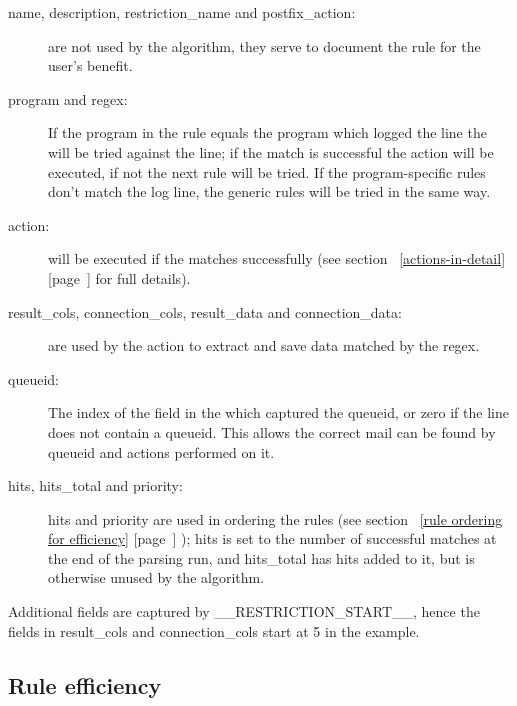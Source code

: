 \documentclass[a4paper,12pt,draft]{article}
\newcommand{\refwithpage}[1]{%
    \empty{}\ref{#1} [page~\pageref{#1}]%
}
\begin{document}
\begin{description}

    \item [name, description, restriction\_name and postfix\_action:] are
        not \newline used by the algorithm, they serve to document the rule
        for the user's benefit.

    \item [program and regex:] If the program in the rule equals the
        program which logged the line the \regex{} will be tried against
        the line; if the match is successful the action will be executed,
        if not the next rule will be tried.  If the program-specific rules
        don't match the log line, the generic rules will be tried in the
        same way.

    \item [action:] will be executed if the \regex{} matches successfully
        (see section~\refwithpage{actions-in-detail} for full details).

    \item [result\_cols, connection\_cols, result\_data and
        connection\_data:] are \newline used by the action to extract and
        save data matched by the regex.

    \item [queueid:] The index of the field in the \regex{} which captured
        the queueid, or zero if the line does not contain a queueid.  This
        allows the correct mail can be found by queueid and actions
        performed on it.

    \item [hits, hits\_total and priority:] hits and priority are used in
        ordering the rules (see section~\refwithpage{rule ordering for
        efficiency}); hits is set to the number of successful matches at
        the end of the parsing run, and hits\_total has hits added to it,
        but is otherwise unused by the algorithm.

\end{description}

Additional fields are captured by \_\_RESTRICTION\_START\_\_, hence the
fields in result\_cols and connection\_cols start at 5 in the example.


\subsection{Rule efficiency}
\end{document}
